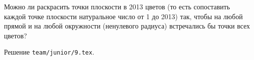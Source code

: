 \problem{}
Можно ли раскрасить точки плоскости в 2013 цветов
(то есть сопоставить каждой точке плоскости натуральное число от 1 до 2013)
так, чтобы на любой прямой и на любой окружности (ненулевого радиуса)
встречались бы точки всех цветов?

\solution Решение \texttt{team/junior/9.tex}.
\endproblem
